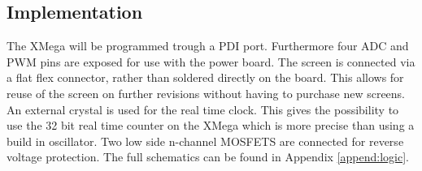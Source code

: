 \subsection{Implementation}
The XMega will be programmed trough a PDI port. Furthermore four ADC and PWM pins are exposed for use with the power board. The screen is connected via a flat flex connector, rather than soldered directly on the board. This allows for reuse of the screen on further revisions without having to purchase new screens.\newpar
An external crystal is used for the real time clock. This gives the possibility to use the 32 bit real time counter on the XMega which is more precise than using a build in oscillator. Two low side n-channel MOSFETS are connected for reverse voltage protection. \newpar
The full schematics can be found in Appendix \ref{append:logic}.